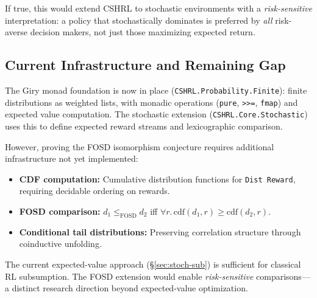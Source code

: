 \documentclass[9pt,a4paper]{article}
\theoremstyle{plain}
\theoremstyle{definition}
\theoremstyle{remark}
\begin{document}
If true, this would extend CSHRL to stochastic environments with a \emph{risk-sensitive} interpretation: a policy that stochastically dominates is preferred by \emph{all} risk-averse decision makers, not just those maximizing expected return.

\subsection{Current Infrastructure and Remaining Gap}

The Giry monad foundation is now in place (\texttt{CSHRL.Probability.Finite}): finite distributions as weighted lists, with monadic operations (\texttt{pure}, \texttt{>>=}, \texttt{fmap}) and expected value computation. The stochastic extension (\texttt{CSHRL.Core.Stochastic}) uses this to define expected reward streams and lexicographic comparison.

However, proving the FOSD isomorphism conjecture requires additional infrastructure not yet implemented:
\begin{itemize}
\item \textbf{CDF computation:} Cumulative distribution functions for \texttt{Dist Reward}, requiring decidable ordering on rewards.
\item \textbf{FOSD comparison:} $d_1 \le_{\text{FOSD}} d_2$ iff $\forall r.\, \text{cdf}(d_1, r) \ge \text{cdf}(d_2, r)$.
\item \textbf{Conditional tail distributions:} Preserving correlation structure through coinductive unfolding.
\end{itemize}

The current expected-value approach (\S\ref{sec:stoch-sub}) is sufficient for classical RL subsumption.  The FOSD extension would enable \emph{risk-sensitive} comparisons---a distinct research direction beyond expected-value optimization.
\end{document}
